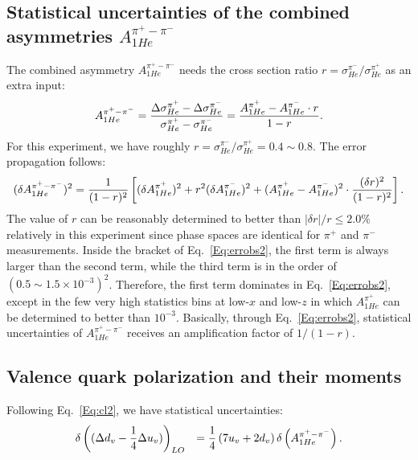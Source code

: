 \subsection{Statistical uncertainties of the combined asymmetries  $A_{1He}^{\pi^+ - \pi^-}$ }
The combined asymmetry $A_{1He}^{\pi^+ - \pi^-}$ needs the 
 cross section ratio $r=\sigma_{He}^{\pi^-}/\sigma_{He}^{\pi^+}$ as an extra input:
\begin{equation}
\label{Eq:obs2}
A_{1He}^{\pi^+ - \pi^-}  =  { \Delta \sigma_{He}^{\pi^+} -\Delta \sigma_{He}^{\pi^-} \over
\sigma_{He}^{\pi^+} - \sigma_{He}^{\pi^-} }=
{ A_{1He}^{\pi^+} -  A_{1He}^{\pi^-} \cdot r
\over 1 - r }.
\end{equation}
For this experiment, we have roughly $r=\sigma^{\pi^-}_{He}/\sigma^{\pi^+}_{He}=0.4 \sim 0.8$. 
The error propagation follows:
\begin{equation}
\label{Eq:errobs2}
(\delta A_{1He}^{\pi^+ - \pi^-})^2  = {1 \over (1 - r)^2} \left[ (\delta  A_{1He}^{\pi^+} )^2 + 
r^2 (\delta  A_{1He}^{\pi^-} )^2
+(A_{1He}^{\pi^+} - A_{1He}^{\pi^-} )^2   \cdot {(\delta r)^2  \over (1 - r)^2}  \right].
\end{equation}
The value of $r$ can be reasonably determined to better than 
 $|\delta r|/r \le 2.0 \%$  relatively in this experiment since phase spaces are identical for $\pi^+$ and 
$\pi^-$ measurements.  
 Inside the bracket of Eq.~\ref{Eq:errobs2}, the first term is always larger than the second term, while the third term is in the order of $(0.5\sim 1.5 \times10^{-3})^2$. 
Therefore, the first term dominates in Eq.~\ref{Eq:errobs2}, except in the few very high statistics bins at low-$x$ and low-$z$ in which  $A_{1He}^{\pi^+}$ can be  determined to better than $10^{-3}$. Basically, through Eq.~\ref{Eq:errobs2}, statistical uncertainties of $A_{1He}^{\pi^+ - \pi^-}$ receives an amplification factor  of $1/(1-r)$.

\subsection{Valence quark polarization and their moments}
Following Eq.~\ref{Eq:cl2},  we have  statistical uncertainties:
\begin{eqnarray}
\label{Eq:errcl2}
& \delta \left( (\Delta d_v-{1 \over 4} \Delta u_v ) \right)_{LO} &  = {1 \over 4} \left( 7 u_v + 2 d_v \right)  \delta \left(A_{1He}^{\pi^+ - \pi^-} \right).
\end{eqnarray}

